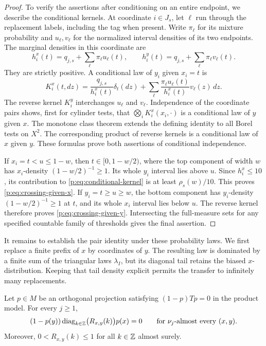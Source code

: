\begin{proof}
To verify the assertions after conditioning on an entire endpoint,
we describe the conditional kernels.  At coordinate $i\in J_s$, let
$\ell$ run through the replacement labels, including the tag when
present.  Write $\pi_\ell$ for its mixture probability and
$u_\ell,v_\ell$ for the normalized interval densities of its two
endpoints.  The marginal densities in this coordinate are
\[
 h_i^x(t)=q_{j,s}+\sum_\ell\pi_\ell u_\ell(t),
 \qquad
 h_i^y(t)=q_{j,s}+\sum_\ell\pi_\ell v_\ell(t).
\]
They are strictly positive.  A conditional law of $y_i$ given $x_i=t$
is
\begin{equation}\label{p:eq:conditional-kernel}
 K_i^x(t,dz)=\frac{q_{j,s}}{h_i^x(t)}\delta_t(dz)
       +\sum_\ell\frac{\pi_\ell u_\ell(t)}{h_i^x(t)}
                              v_\ell(z)\,dz.
\end{equation}
The reverse kernel $K_i^y$ interchanges $u_\ell$ and $v_\ell$.
Independence of the coordinate pairs shows, first for cylinder tests,
that $\bigotimes_i K_i^x(x_i,\cdot)$ is a conditional law of $y$ given
$x$.  The monotone class theorem extends the defining identity to
all Borel tests on $X^2$.  The corresponding product of reverse
kernels is a conditional law of $x$ given $y$.  These formulas prove
both assertions of conditional independence.

If $x_i=t<u\le1-w$, then $t\in[0,1-w/2)$, where the top component of
width $w$ has $x_i$-density $(1-w/2)^{-1}\ge1$.  Its whole $y_i$
interval lies above $u$.  Since $h_i^x\le10$, its contribution to
\eqref{p:eq:conditional-kernel} is at least $\rho_s(w)/10$.
This proves \eqref{p:eq:crossing-given-x}.  If $y_i=t\ge u\ge w$,
the bottom component has $y_i$-density $(1-w/2)^{-1}\ge1$ at $t$,
and its whole $x_i$ interval lies below $u$.  The reverse kernel
therefore proves \eqref{p:eq:crossing-given-y}.  Intersecting the
full-measure sets for any specified countable family of thresholds
gives the final assertion.
\end{proof}

It remains to establish the pair identity under these probability laws.
We first replace a finite prefix of $x$ by coordinates of $y$.  The
resulting law is dominated by a finite sum of the triangular laws
$\lambda_I$, but its diagonal tail retains the biased $x$-distribution.
Keeping that tail density explicit permits the transfer to infinitely
many replacements.

\begin{proposition}
\label{p:prop:biased-identity}
Let $p\in M$ be an orthogonal projection satisfying $(1-p)Tp=0$ in the
product model.  For every $j\ge1$,
\begin{equation}\label{p:eq:biased-identity}
 (1-p(y))\operatorname{diag}_{k\in\mathbb Z}\bigl(R_{x,y}(k)\bigr)p(x)=0
 \qquad\text{for }\nu_j\text{-almost every }(x,y).
\end{equation}
Moreover, $0<R_{x,y}(k)\le1$ for all $k\in\mathbb Z$ almost surely.
\end{proposition}

